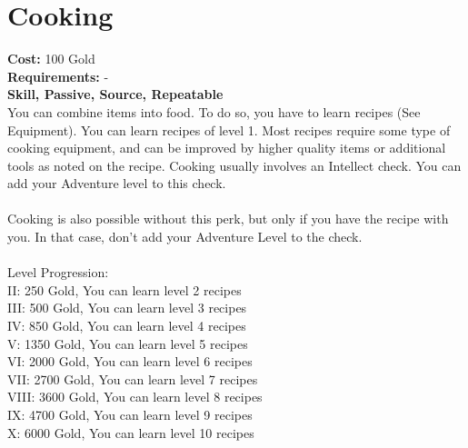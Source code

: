 \section{Cooking}
\textbf{Cost:} 100 Gold\\
\textbf{Requirements:} -\\
\textbf{Skill, Passive, Source, Repeatable}\\
You can combine items into food. To do so, you have to learn recipes (See Equipment). You can learn recipes of level 1. Most recipes require some type of cooking equipment, and can be improved by higher quality items or additional tools as noted on the recipe. Cooking usually involves an Intellect check. You can add your Adventure level to this check. \\
\\
Cooking is also possible without this perk, but only if you have the recipe with you. In that case, don't add your Adventure Level to the check.\\
\\
Level Progression:\\
II: 250 Gold, You can learn level 2 recipes\\
III: 500 Gold, You can learn level 3 recipes\\
IV: 850 Gold, You can learn level 4 recipes\\
V: 1350 Gold, You can learn level 5 recipes\\
VI: 2000 Gold, You can learn level 6 recipes\\
VII: 2700 Gold, You can learn level 7 recipes\\
VIII: 3600 Gold, You can learn level 8 recipes\\
IX: 4700 Gold, You can learn level 9 recipes\\
X: 6000 Gold, You can learn level 10 recipes\\